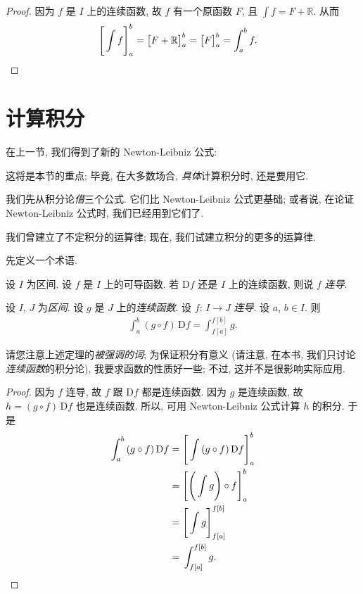\begin{proof}
    因为 $f$ 是 $I$ 上的连续函数, 故 $f$ 有一个原函数 $F$, 且 $\int {f} = F + \mathbb{R}$. 从而
    \begin{align*}
         & \Bigg[ \int {f} \Bigg]_{a}^{b}
        = \big[ F + \mathbb{R} \big]_{a}^{b}
        = \big[ F \big]_{a}^{b}
        = \int_{a}^{b} {f}. \qedhere
    \end{align*}
\end{proof}

\section{计算积分}

在上一节, 我们得到了新的 Newton-Leibniz 公式:

\NewNewtonLeibniz*

这将是本节的重点; 毕竟, 在大多数场合, \emph{具体}计算积分时, 还是要用它.

我们先从积分论\emph{借}三个公式. 它们比 Newton-Leibniz 公式更基础; 或者说, 在论证 Newton-Leibniz 公式时, 我们已经用到它们了.

\LinearityOfInegrals*

\AdditivityOfIntervalsOfIntegrals*

我们曾建立了不定积分的运算律; 现在, 我们试建立积分的更多的运算律.

先定义一个术语.

\begin{definition}
    设 $I$ 为区间. 设 $f$ 是 $I$ 上的可导函数. 若 $\mathrm{D}f$ 还是 $I$ 上的连续函数, 则说 $f$ \emph{连导}.
\end{definition}

\begin{theorem}
    设 $I$, $J$ 为\emph{区间}. 设 $g$ 是 $J$ 上的\emph{连续函数}. 设 $f$: $I \to J$ \emph{连导}. 设 $a$, $b \in I$. 则
    \begin{align*}
        \int_{a}^{b} {(g \circ f)\,\mathrm{D}f} = \int_{f[a]}^{f[b]} {g}.
    \end{align*}
\end{theorem}

请您注意上述定理的\emph{被强调的词}; 为保证积分有意义 (请注意, 在本书, 我们只讨论\emph{连续函数}的积分论), 我要求函数的性质好一些; 不过, 这并不是很影响实际应用.

\begin{proof}
    因为 $f$ 连导, 故 $f$ 跟 $\mathrm{D}f$ 都是连续函数. 因为 $g$ 是连续函数, 故 $h = (g \circ f)\,\mathrm{D}f$ 也是连续函数. 所以, 可用 Newton-Leibniz 公式计算 $h$ 的积分. 于是
    \begin{align*}
        \int_{a}^{b} {(g \circ f)\,\mathrm{D}f}
        = {} & \Bigg[ \int {(g \circ f)\,\mathrm{D}f} \Bigg]_{a}^{b} \\
        = {} & \Bigg[ \Bigg( \int {g} \Bigg) \circ f \Bigg]_{a}^{b}  \\
        = {} & \Bigg[ \int {g} \Bigg]_{f[a]}^{f[b]}                  \\
        = {} & \int_{f[a]}^{f[b]} {g}. \qedhere
    \end{align*}
\end{proof}

